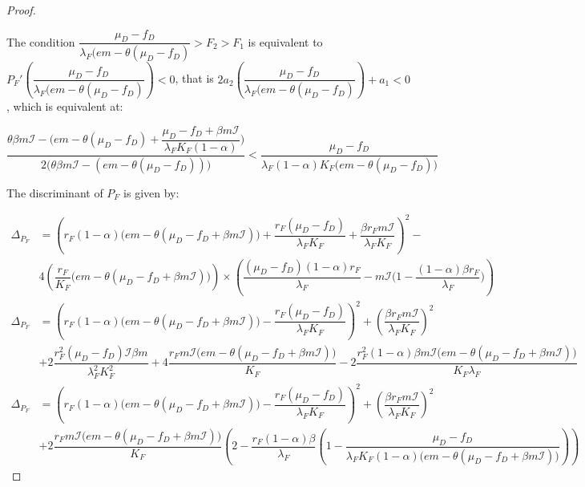 \documentclass{article}
\newcommand{\lfw}{\lambda_{F}}
\newcommand{\lfw}{\lambda_{F}}
\newcommand{\cI}{\mathcal{I}}
\begin{document}
\begin{proof}
\begin{itemize}
\begin{itemize}
\begin{itemize}
The condition $\dfrac{\mu_D - f_D}{\lfw \Big(e m - \theta (\mu_D - f_D)} > F_2 > F_1$ is equivalent to $P_F'\left(\dfrac{\mu_D - f_D}{\lfw \Big(e m - \theta (\mu_D - f_D)}\right) < 0$, that is $2a_2\left(\dfrac{\mu_D - f_D}{\lfw \Big(e m - \theta (\mu_D - f_D)}\right) + a_1 < 0$, which is equivalent at:

$$\dfrac{  \theta \beta m \cI - \Big(em - \theta(\mu_D-f_D) + \dfrac{\mu_D-f_D + \beta m \cI}{\lfw K_F(1-\alpha) } \Big) }{2 \Big( \theta \beta m \cI - (em - \theta(\mu_D-f_D)) \Big)} < \dfrac{\mu_D - f_D}{\lfw (1-\alpha) K_F \Big(e m - \theta (\mu_D - f_D)  \Big) }$$
\end{itemize}

\end{itemize}
\end{itemize}

The discriminant of $P_F$ is given by:

\begin{subequations}
\begin{align}
\Delta_{P_F} &= \left(r_F (1-\alpha)   \Big(em - \theta(\mu_D-f_D + \beta m \cI)  \Big) + \dfrac{r_F(\mu_D-f_D)}{\lfw K_F} + \dfrac{\beta r_F m \cI}{\lfw K_F} \right)^2 - \\ \nonumber & 4 \left(\dfrac{r_F}{K_F} \Big(em - \theta(\mu_D-f_D + \beta m \cI) \Big) \right) \times \left(\dfrac{(\mu_D - f_D)(1-\alpha) r_F}{\lfw} - m\cI\Big(1 - \dfrac{(1-\alpha)\beta r_F}{\lfw} \Big) \right) \\
\Delta_{P_F} &= \left(r_F (1-\alpha)   \Big(em - \theta(\mu_D-f_D + \beta m \cI)  \Big) - \dfrac{r_F(\mu_D-f_D) }{\lfw K_F} \right)^2 + \left( \dfrac{\beta r_F m \cI}{\lfw K_F}\right)^2 \\ \nonumber & + 2 \dfrac{r_F^2 (\mu_D - f_D) \cI \beta m}{\lfw^2 K_F^2} + 4 \dfrac{r_F m \cI \Big(e m - \theta (\mu_D - f_D + \beta m \cI)\Big)}{K_F} - 2\dfrac{r_F^2(1-\alpha) \beta m \cI\Big(e m - \theta (\mu_D - f_D + \beta m \cI)\Big)}{K_F \lfw} \\
\Delta_{P_F} &= \left(r_F (1-\alpha)   \Big(em - \theta(\mu_D-f_D + \beta m \cI)  \Big) - \dfrac{r_F(\mu_D-f_D) }{\lfw K_F} \right)^2 + \left( \dfrac{\beta r_F m \cI}{\lfw K_F}\right)^2 \label{discrminantPF} 
\\ \nonumber &  +  2 \dfrac{r_F m \cI \Big(e m - \theta (\mu_D - f_D + \beta m \cI)\Big)}{K_F} \left(2 - \dfrac{r_F(1-\alpha)\beta }{\lfw} \left(1 - \dfrac{\mu_D - f_D}{\lfw K_F(1-\alpha) \Big(e m - \theta (\mu_D - f_D + \beta m \cI)\Big)}\right) \right) 
\end{align}
\end{subequations}


\end{proof}
\end{document}
